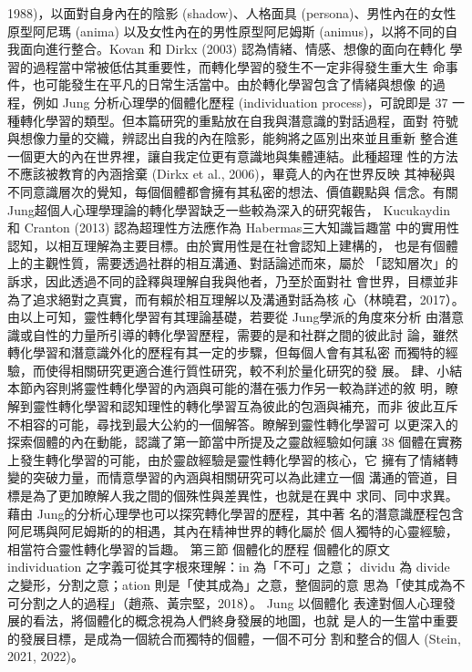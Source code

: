 1988)，以面對自身內在的陰影 (shadow)、人格面具 (persona)、男性內在的女性
原型阿尼瑪 (anima) 以及女性內在的男性原型阿尼姆斯 (animus)，以將不同的自
我面向進行整合。Kovan 和 Dirkx (2003) 認為情緒、情感、想像的面向在轉化
學習的過程當中常被低估其重要性，而轉化學習的發生不一定非得發生重大生
命事件，也可能發生在平凡的日常生活當中。由於轉化學習包含了情緒與想像
的過程，例如 Jung 分析心理學的個體化歷程 (individuation process)，可說即是
37 
一種轉化學習的類型。但本篇研究的重點放在自我與潛意識的對話過程，面對
符號與想像力量的交織，辨認出自我的內在陰影，能夠將之區別出來並且重新
整合進一個更大的內在世界裡，讓自我定位更有意識地與集體連結。此種超理
性的方法不應該被教育的內涵捨棄 (Dirkx et al., 2006)，畢竟人的內在世界反映
其神秘與不同意識層次的覺知，每個個體都會擁有其私密的想法、價值觀點與
信念。有關 Jung超個人心理學理論的轉化學習缺乏一些較為深入的研究報告，
Kucukaydin 和 Cranton (2013) 認為超理性方法應作為 Habermas三大知識旨趣當
中的實用性認知，以相互理解為主要目標。由於實用性是在社會認知上建構的，
也是有個體上的主觀性質，需要透過社群的相互溝通、對話論述而來，屬於
「認知層次」的訴求，因此透過不同的詮釋與理解自我與他者，乃至於面對社
會世界，目標並非為了追求絕對之真實，而有賴於相互理解以及溝通對話為核
心（林曉君，2017）。 
由以上可知，靈性轉化學習有其理論基礎，若要從 Jung學派的角度來分析
由潛意識或自性的力量所引導的轉化學習歷程，需要的是和社群之間的彼此討
論，雖然轉化學習和潛意識外化的歷程有其一定的步驟，但每個人會有其私密
而獨特的經驗，而使得相關研究更適合進行質性研究，較不利於量化研究的發
展。 
肆、小結 
本節內容則將靈性轉化學習的內涵與可能的潛在張力作另一較為詳述的敘
明，瞭解到靈性轉化學習和認知理性的轉化學習互為彼此的包涵與補充，而非
彼此互斥不相容的可能，尋找到最大公約的一個解答。瞭解到靈性轉化學習可
以更深入的探索個體的內在動能，認識了第一節當中所提及之靈啟經驗如何讓
38 
個體在實務上發生轉化學習的可能，由於靈啟經驗是靈性轉化學習的核心，它
擁有了情緒轉變的突破力量，而情意學習的內涵與相關研究可以為此建立一個
溝通的管道，目標是為了更加瞭解人我之間的個殊性與差異性，也就是在異中
求同、同中求異。藉由 Jung的分析心理學也可以探究轉化學習的歷程，其中著
名的潛意識歷程包含阿尼瑪與阿尼姆斯的的相遇，其內在精神世界的轉化屬於
個人獨特的心靈經驗，相當符合靈性轉化學習的旨趣。 
第三節 個體化的歷程 
個體化的原文 individuation 之字義可從其字根來理解：in 為「不可」之意；
dividu 為 divide 之變形，分割之意；ation 則是「使其成為」之意，整個詞的意
思為「使其成為不可分割之人的過程」（趙燕、黃宗堅，2018）。 Jung 以個體化
表達對個人心理發展的看法，將個體化的概念視為人們終身發展的地圖，也就
是人的一生當中重要的發展目標，是成為一個統合而獨特的個體，一個不可分
割和整合的個人 (Stein, 2021, 2022)。 
